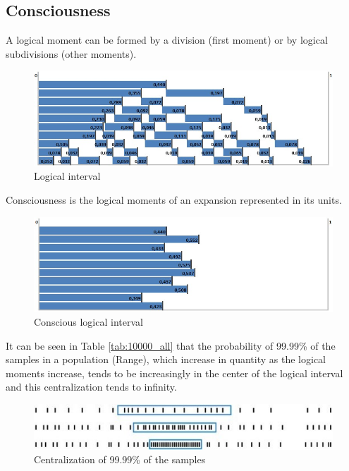 \subsection{Consciousness}
A logical moment can be formed by a division (first moment) or by logical subdivisions (other moments).
	\begin{figure}[H]
	\caption{Logical interval}
	\label{fig:consciousness_logical_moments}
	\centering
	\includegraphics[scale=.7]{sections/images/consciousness_logical_moments.jpg}
	\end{figure}

Consciousness is the logical moments of an expansion represented in its units.
	\begin{figure}[H]
	\caption{Conscious logical interval}
	\label{fig:consciousness}
	\centering
	\includegraphics[scale=.7]{sections/images/consciousness.jpg}
	\end{figure}

It can be seen in Table \ref{tab:10000_all} that the probability of 99.99\% of the samples in a population (Range), which increase in quantity as the logical moments increase, tends to be increasingly in the center of the logical interval and this centralization tends to infinity.
	\begin{figure}[H]
	\caption{Centralization of 99.99\% of the samples}
	\label{fig:centering_of_99_range}
	\centering
	\includegraphics[scale=1]{sections/images/centering_of_99_range.jpg}
	\end{figure}

